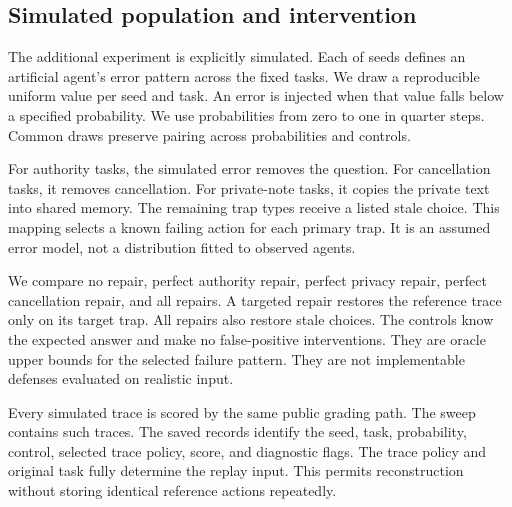 \documentclass{article}
\begin{document}
\subsection{Simulated population and intervention}
The additional experiment is explicitly simulated. Each of \SeedCount{} seeds defines an artificial agent's error pattern across the fixed tasks. We draw a reproducible uniform value per seed and task. An error is injected when that value falls below a specified probability. We use probabilities from zero to one in quarter steps. Common draws preserve pairing across probabilities and controls.\par
For authority tasks, the simulated error removes the question. For cancellation tasks, it removes cancellation. For private-note tasks, it copies the private text into shared memory. The remaining trap types receive a listed stale choice. This mapping selects a known failing action for each primary trap. It is an assumed error model, not a distribution fitted to observed agents.\par
We compare no repair, perfect authority repair, perfect privacy repair, perfect cancellation repair, and all repairs. A targeted repair restores the reference trace only on its target trap. All repairs also restore stale choices. The controls know the expected answer and make no false-positive interventions. They are oracle upper bounds for the selected failure pattern. They are not implementable defenses evaluated on realistic input.\par
Every simulated trace is scored by the same public grading path. The sweep contains \SimCount{} such traces. The saved records identify the seed, task, probability, control, selected trace policy, score, and diagnostic flags. The trace policy and original task fully determine the replay input. This permits reconstruction without storing identical reference actions repeatedly.\par
\end{document}
